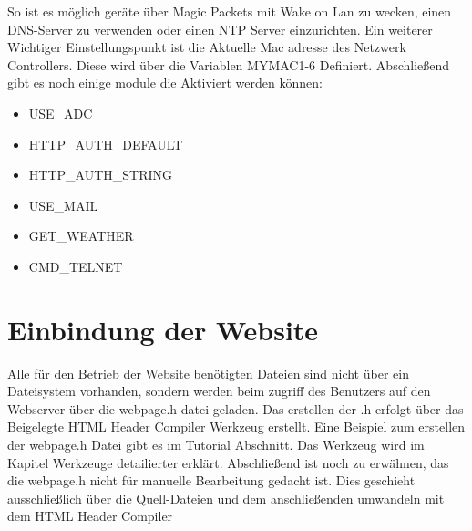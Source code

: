 So ist es möglich geräte über Magic Packets mit Wake on Lan zu wecken, einen
DNS-Server zu verwenden oder einen NTP Server einzurichten.
Ein weiterer Wichtiger Einstellungspunkt ist die Aktuelle Mac adresse des
Netzwerk Controllers. Diese wird über die Variablen MYMAC1-6 Definiert.
Abschließend gibt es noch einige module die Aktiviert werden können:
\begin{itemize}
  \item USE\_ADC
  \item HTTP\_AUTH\_DEFAULT
  \item HTTP\_AUTH\_STRING
  \item USE\_MAIL
  \item GET\_WEATHER
  \item CMD\_TELNET
\end{itemize}


\section{Einbindung der Website}

Alle für den Betrieb der Website benötigten Dateien sind nicht über ein
Dateisystem vorhanden, sondern werden beim zugriff des Benutzers auf den
Webserver über die \textrm{webpage.h} datei geladen.
Das erstellen der .h erfolgt über das Beigelegte \textrm{HTML Header Compiler}
Werkzeug erstellt. Eine Beispiel zum erstellen der \textrm{webpage.h} Datei gibt
es im Tutorial Abschnitt. Das Werkzeug wird im Kapitel Werkzeuge detailierter
erklärt. Abschließend ist noch zu erwähnen, das die \textrm{webpage.h} nicht für manuelle
Bearbeitung gedacht ist. Dies geschieht ausschließlich über die Quell-Dateien
und dem anschließenden umwandeln mit dem \textrm{HTML Header Compiler}


